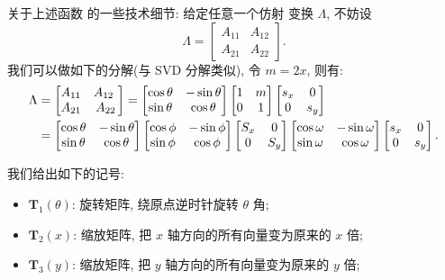 \documentclass[
  hyper, 
  lang = cn, 
  class = l3doc,
  classOption={11pt},
  sect = {load=false},
]{../../zlatex/code/ztex}
\begin{document}
\clearpage
{\sffamily\color{red} 关于上述函数  的一些技术细节}: 给定任意一个仿射
变换 $\Lambda$, 不妨设
\[
  \Lambda = \begin{bmatrix}
    A_{11} & A_{12} \\
    A_{21} & A_{22}
  \end{bmatrix}.
\]
我们可以做如下的分解(与 SVD 分解类似), 令 $m=2x$, 则有:
\begin{align}\label{eq:affine-matrix}
  \Lambda 
  & = \begin{bmatrix} A_{11} & A_{12} \ \\ A_{21} & A_{22} \end{bmatrix} 
    = \begin{bmatrix} \cos \theta & -\sin \theta \\ \sin \theta & \cos \theta \end{bmatrix} 
    \begin{bmatrix} 1 & m \\ 0 & 1 \end{bmatrix} 
    \begin{bmatrix} s_x & 0 \\ 0 & s_y \end{bmatrix} \notag \\
  & = \begin{bmatrix} \cos \theta & -\sin \theta \\ \sin \theta & \cos \theta \end{bmatrix}
    \begin{bmatrix}\cos \phi&-\sin\phi\\\sin\phi&\cos\phi\end{bmatrix}
    \begin{bmatrix}S_x&0\\0&S_y\end{bmatrix}
    \begin{bmatrix}\cos \omega&-\sin\omega\\\sin\omega&\cos\omega\end{bmatrix}
    \begin{bmatrix} s_x & 0 \\ 0 & s_y \end{bmatrix}.
\end{align}

我们给出如下的记号:
\begin{itemize}
  \item $\mathbf{T}_1(\theta)$: 旋转矩阵, 绕原点逆时针旋转 $\theta$ 角;
  \item $\mathbf{T}_2(x)$: 缩放矩阵, 把 $x$ 轴方向的所有向量变为原来的 $x$ 倍;
  \item $\mathbf{T}_3(y)$: 缩放矩阵, 把 $y$ 轴方向的所有向量变为原来的 $y$ 倍;
\end{itemize}
\end{document}
